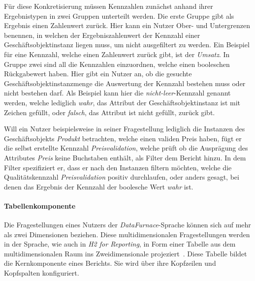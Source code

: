 \documentclass[
  language=german, %
  type=bachelor,%
  ngerman
]{isthesis}
\begin{document}
\begin{content}
  Für diese Konkretisierung müssen Kennzahlen zunächst anhand ihrer
  Ergebnistypen in zwei Gruppen unterteilt werden. Die erste Gruppe gibt als
  Ergebnis einen Zahlenwert zurück. Hier kann ein Nutzer Ober- und Untergrenzen
  benennen, in welchen der Ergebniszahlenwert der Kennzahl einer
  Geschäftsobjektinstanz liegen muss, um nicht ausgefiltert zu werden. Ein
  Beispiel für eine Kennzahl, welche einen Zahlenwert zurück gibt, ist der
  \textit{Umsatz}. In Gruppe zwei sind all die Kennzahlen einzuordnen, welche
  einen booleschen Rückgabewert haben. Hier gibt ein Nutzer an, ob die gesuchte
  Geschäftsobjektinstanzmenge die Auswertung der Kennzahl bestehen muss oder
  nicht bestehen darf. Als Beispiel kann hier die \textit{nicht-leer}-Kennzahl
  genannt werden, welche lediglich \textit{wahr}, das Attribut der
  Geschäftsobjektinstanz ist mit Zeichen gefüllt, oder \textit{falsch}, das
  Attribut ist nicht gefüllt, zurück gibt.

  Will ein Nutzer beispielsweise in seiner Fragestellung lediglich die
  Instanzen des Geschäftsobjekts \textit{Produkt} betrachten, welche einen
  validen Preis haben, fügt er die selbst erstellte Kennzahl
  \textit{Preisvalidation}, welche prüft ob die Ausprägung des Attributes
  \textit{Preis} keine Buchstaben enthält, als Filter dem Bericht hinzu. In dem
  Filter spezifiziert er, dass er nach den Instanzen filtern möchten, welche
  die Qualitätskennzahl \textit{Preisvalidation} positiv durchlaufen, oder
  anders gesagt, bei denen das Ergebnis der Kennzahl der boolesche Wert
  \textit{wahr} ist.

  \paragraph{Tabellenkomponente}\label{paragraph:tabellenkomponente} 
  Die Fragestellungen eines Nutzers der \textit{DataFurnace}-Sprache können
  sich auf mehr als zwei Dimensionen beziehen. Diese multidimensionalen
  Fragestellungen werden in der Sprache, wie auch in \textit{H2 for Reporting},
  in Form einer Tabelle aus dem multidimensionalen Raum ins Zweidimensionale
  projeziert~\cite[][S.  23]{becker2007h2}. Diese Tabelle bildet die
  Kernkomponente eines Berichts.  Sie wird über ihre Kopfzeilen und Kopfspalten
  konfiguriert.


\end{content}
\end{document}
